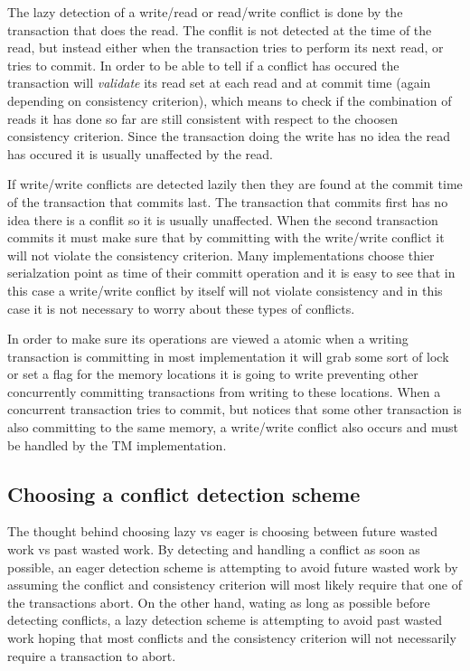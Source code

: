The lazy detection of a write/read or read/write conflict is done by the transaction that does the read.
The conflit is not detected at the time of the read, but instead either when the transaction tries to perform its next read, or tries to commit.
In order to be able to tell if a conflict has occured the transaction will \emph{validate} its read set at each read and at commit time (again depending on consistency criterion), which means to check if the combination of reads it has done so far are still consistent with respect to the choosen consistency criterion.
Since the transaction doing the write has no idea the read has occured it is usually unaffected by the read.

If write/write conflicts are detected lazily then they are found at the commit time of the transaction that commits last.
The transaction that commits first has no idea there is a conflit so it is usually unaffected.
When the second transaction commits it must make sure that by committing with the write/write conflict it will not violate the consistency criterion.
Many implementations choose thier serialzation point as time of their committ operation and it is easy to see that in this case a write/write conflict by itself will not violate consistency and in this case it is not necessary to worry about these types of conflicts.

In order to make sure its operations are viewed a atomic when a writing transaction is committing in most implementation it will grab some sort of lock or set a flag for the memory locations it is going to write preventing other concurrently committing transactions from writing to these locations.
When a concurrent transaction tries to commit, but notices that some other transaction is also committing to the same memory, a write/write conflict also occurs and must be handled by the TM implementation.

\subsection{Choosing a conflict detection scheme}

The thought behind choosing lazy vs eager is choosing between future wasted work vs past wasted work.
By detecting and handling a conflict as soon as possible, an eager detection scheme is attempting to avoid future wasted work by assuming the conflict and consistency criterion will most likely require that one of the transactions abort.
On the other hand, wating as long as possible before detecting conflicts, a lazy detection scheme is attempting to avoid past wasted work hoping that most conflicts and the consistency criterion will not necessarily require a transaction to abort.

